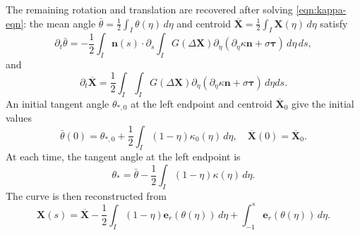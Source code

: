 \documentclass[11pt,reqno]{amsart}
\theoremstyle{plain}
\theoremstyle{definition}
\numberwithin{equation}{section}
\newcommand{\paren}[1]{\left(#1\right)}
\newcommand{\p}{\partial}
\newcommand{\bm}[1]{\boldsymbol{#1}}
\begin{document}
The remaining rotation and translation are recovered after solving
\eqref{eqn:kappa-eqn}: the mean angle
$\bar\theta=\frac12\int_I\theta(\eta)\,d\eta$ and centroid
$\overline{\bm X}=\frac12\int_I\bm X(\eta)\,d\eta$ satisfy
\begin{equation}\label{eqn:theta-bar}
    \p_t\bar\theta
    = -\frac{1}{2}\int_I \bm n(s)\cdot\p_s\int_I
    G(\Delta\bm X)\p_\eta\paren{ \p_\eta\kappa\bm n+\sigma\bm \tau }
    \,d\eta \,ds,
\end{equation}
and
\begin{equation}\label{eqn:X-bar}
    \p_t \overline{\bm X}
    = \frac{1}{2}\int_I \int_I
    G(\Delta\bm X)\p_\eta\paren{ \p_\eta\kappa\bm n+\sigma\bm \tau }
    \,d\eta ds.
\end{equation}
An initial tangent angle $\theta_{*,0}$ at the left endpoint and
centroid $\overline{\bm X}_0$ give the initial values
\begin{equation}\label{eqn:reconstruction-initial-means}
    \bar\theta(0)
    =\theta_{*,0}
    +\frac12\int_I(1-\eta)\kappa_0(\eta)\,d\eta,
    \quad
    \overline{\bm X}(0)=\overline{\bm X}_0.
\end{equation}
At each time, the tangent angle at the left endpoint is
\begin{equation}\label{eqn:reconstruction-endpoint-angle}
    \theta_*=\bar\theta-\frac12\int_I(1-\eta)\kappa(\eta)\,d\eta.
\end{equation}
The curve is then reconstructed from
\begin{equation}\label{eqn:curve-reconstruction}
    \bm X(s)
    =\overline{\bm X}
    -\frac12\int_I(1-\eta)\bm e_r(\theta(\eta))\,d\eta
    +\int_{-1}^s\bm e_r(\theta(\eta))\,d\eta.
\end{equation}
\end{document}
